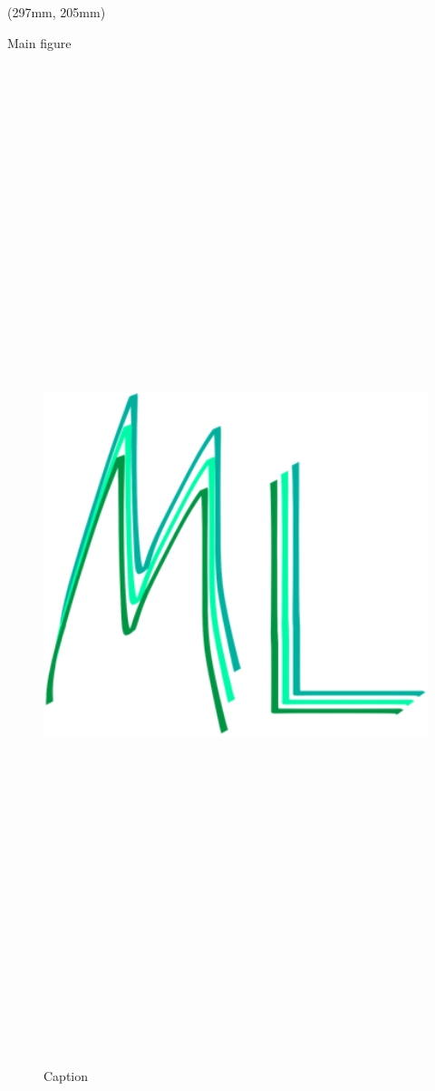 \documentclass{beamer}
\begin{document}
\begin{frame}
    \begin{textblock*}{514mm}(297mm, 205mm)
        \begin{minipage}[t][569mm][t]{\textwidth}
            \begin{block}{Main figure}
                \begin{figure}
                    \centering
                    \includegraphics[width=\textwidth, height=560mm]{images/logo-ml.png}
                    \caption{Caption}
                    \label{fig:header_fig}
                \end{figure}
                

\end{block}
\end{minipage}
\end{textblock*}
\end{frame}
\end{document}
